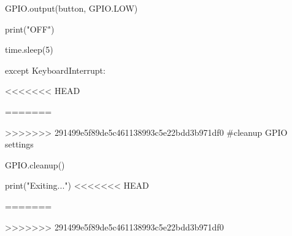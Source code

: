 \documentclass[onecolumn, draftclsnofoot,10pt, compsoc]{IEEEtran}
\begin{document}
				\begin{flushleft}
				\quad \quad GPIO.output(button, GPIO.LOW)
				\end{flushleft}
				\begin{flushleft}
				\quad \quad print("OFF")
				\end{flushleft}
				\begin{flushleft}
				\quad \quad time.sleep(5)
				\end{flushleft}
\begin{flushleft}
except KeyboardInterrupt:
\end{flushleft}
<<<<<<< HEAD
	\begin{flushleft}
=======
		\begin{flushleft}
>>>>>>> 291499e5f89de5c461138993c5e22bdd3b971df0
		\quad \#cleanup GPIO settings
		\end{flushleft}
		\begin{flushleft}
		\quad GPIO.cleanup()
		\end{flushleft}
		\begin{flushleft}
		\quad print("Exiting...")
<<<<<<< HEAD
	\end{flushleft}



=======
		\end{flushleft}
>>>>>>> 291499e5f89de5c461138993c5e22bdd3b971df0


\newpage
\end{document}
